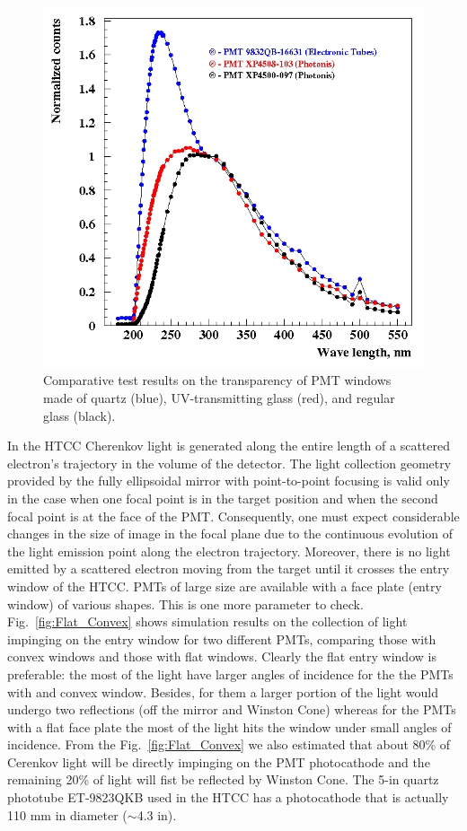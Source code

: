 \begin{figure}[!ht]
    \centering
    \includegraphics[width=1.0\linewidth,trim={1.7cm 0.5cm 0.05cm 0.1cm},clip]{images/Quartz_UV_glass.jpg}
    \caption{Comparative test results on the transparency of PMT windows made of quartz (blue), UV-transmitting glass (red), and regular glass (black).}
    \label{fig:Quartz_UV_glass}
\end{figure}

In the HTCC Cherenkov light is generated along the entire length of a scattered electron's trajectory in the volume of the detector. The light collection geometry provided by the fully ellipsoidal mirror with point-to-point focusing is valid only in the case when one focal point is in the target position and when the second focal point is at the face of the PMT. Consequently, one must expect considerable changes in the size of image in the focal plane due to the continuous evolution of the light emission point along the electron trajectory. Moreover, there is no light emitted by a scattered electron moving from the target until it crosses the entry window of the HTCC. PMTs of large size are available with a face plate (entry window) of various shapes. This is one more parameter to check. Fig.~\ref{fig:Flat_Convex} shows simulation results on the collection of light impinging on the entry window for two different PMTs, comparing those with convex windows and those with flat windows. Clearly the flat entry window is preferable: the most of the light have larger angles of incidence for the the PMTs with and convex window. Besides, for them a larger portion of the light would undergo two reflections (off the mirror and Winston Cone) whereas for the PMTs with a flat face plate the most of the light hits the window under small angles of incidence. From the Fig.~\ref{fig:Flat_Convex} we also estimated that about 80\% of Cerenkov light will be directly impinging on the PMT photocathode and the remaining 20\% of light will fist be reflected by Winston Cone. The 5-in quartz phototube ET-9823QKB used in the HTCC has a photocathode that is actually 110 mm in diameter ($\sim$4.3 in). 

